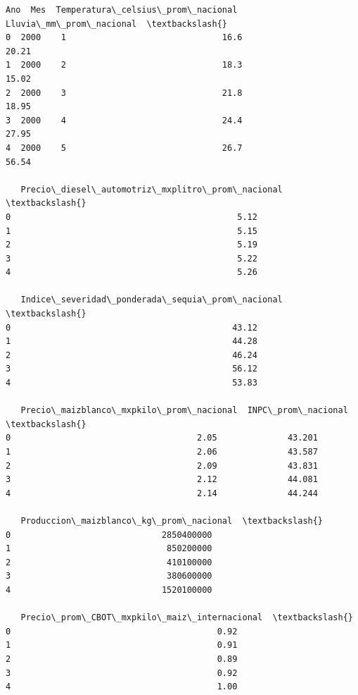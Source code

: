 \documentclass[11pt]{article}
\makeatletter
\newcommand{\boxspacing}{\kern\kvtcb@left@rule\kern\kvtcb@boxsep}
\newcommand{\prompt}[4]{
        {\ttfamily\llap{{\color{#2}[#3]:\hspace{3pt}#4}}\vspace{-\baselineskip}}
    }
\makeatother
\begin{document}
            \begin{tcolorbox}[breakable, size=fbox, boxrule=.5pt, pad at break*=1mm, opacityfill=0]
\prompt{Out}{outcolor}{24}{\boxspacing}
\begin{Verbatim}[commandchars=\\\{\}]
    Ano  Mes  Temperatura\_celsius\_prom\_nacional  Lluvia\_mm\_prom\_nacional  \textbackslash{}
0  2000    1                               16.6                    20.21
1  2000    2                               18.3                    15.02
2  2000    3                               21.8                    18.95
3  2000    4                               24.4                    27.95
4  2000    5                               26.7                    56.54

   Precio\_diesel\_automotriz\_mxplitro\_prom\_nacional  \textbackslash{}
0                                             5.12
1                                             5.15
2                                             5.19
3                                             5.22
4                                             5.26

   Indice\_severidad\_ponderada\_sequia\_prom\_nacional  \textbackslash{}
0                                            43.12
1                                            44.28
2                                            46.24
3                                            56.12
4                                            53.83

   Precio\_maizblanco\_mxpkilo\_prom\_nacional  INPC\_prom\_nacional  \textbackslash{}
0                                     2.05              43.201
1                                     2.06              43.587
2                                     2.09              43.831
3                                     2.12              44.081
4                                     2.14              44.244

   Produccion\_maizblanco\_kg\_prom\_nacional  \textbackslash{}
0                              2850400000
1                               850200000
2                               410100000
3                               380600000
4                              1520100000

   Precio\_prom\_CBOT\_mxpkilo\_maiz\_internacional  \textbackslash{}
0                                         0.92
1                                         0.91
2                                         0.89
3                                         0.92
4                                         1.00


\end{Verbatim}
\end{tcolorbox}
\end{document}
